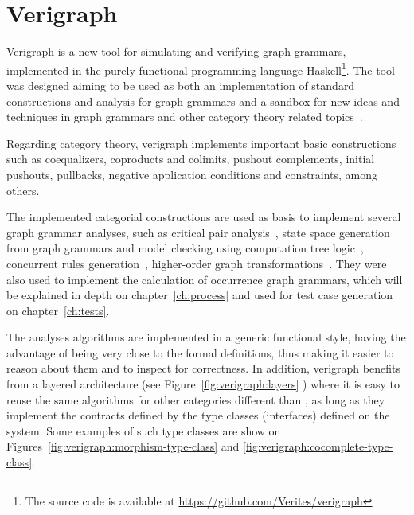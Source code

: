 \chapter{Verigraph}\label{ch:verigraph}

Verigraph is a new tool for simulating and verifying graph grammars, implemented in the purely functional programming language Haskell\footnote{The source code is available at \url{https://github.com/Verites/verigraph}}. The tool was designed aiming to be used as both an implementation of standard constructions and analysis for graph grammars and a sandbox for new ideas and techniques in graph grammars and other category theory related topics~\cite{BezerraETMF2016,Costa2016,CostaETMF2016, Becker2014}.

Regarding category theory, verigraph implements important basic constructions such as coequalizers, coproducts and colimits, pushout complements, initial pushouts, pullbacks, negative application conditions and constraints, among others.

The implemented categorial constructions are used as basis to implement several graph grammar analyses, such as critical pair analysis~\cite{Lambers2006}, state space generation from graph grammars and model checking using computation tree logic~\cite{Becker2014}, concurrent rules generation~\cite{BezerraETMF2016}, higher-order graph transformations~\cite{Machado2015}. They were also used to implement the calculation of occurrence graph grammars, which will be explained in depth on
chapter~\ref{ch:process} and used for test case generation on chapter~\ref{ch:tests}.

The analyses algorithms are implemented in a generic functional style, having the advantage of being very close to the formal definitions, thus making it easier to reason about them and to inspect for correctness. In addition, verigraph benefits from a layered architecture (see Figure~\ref{fig:verigraph:layers} ) where it is easy to reuse the same algorithms for other categories different than , as long as they implement the contracts defined by the type classes (interfaces) defined on the system. Some examples of such type classes are show on
Figures~\ref{fig:verigraph:morphism-type-class} and \ref{fig:verigraph:cocomplete-type-class}.

